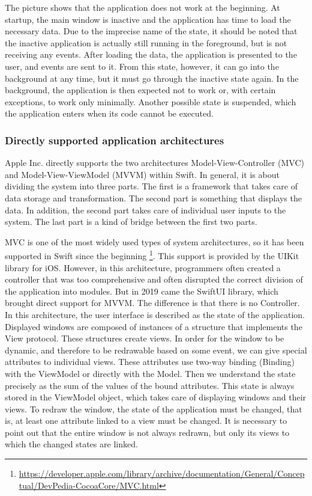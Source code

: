 \documentclass[
  biblatex = false,
  language=english,
  figures=false,
  sourcecodes,
  glossaries,
  index
]{kidiplom}
\begin{document}
The picture shows that the application does not work at the beginning. At startup, the main window is inactive and the application has time to load the necessary data. Due to the imprecise name of the state, it should be noted that the inactive application is actually still running in the foreground, but is not receiving any events. After loading the data, the application is presented to the user, and events are sent to it. From this state, however, it can go into the background at any time, but it must go through the inactive state again. In the background, the application is then expected not to work or, with certain exceptions, to work only minimally. Another possible state is suspended, which the application enters when its code cannot be executed.

\subsubsection{Directly supported application architectures}
Apple Inc. directly supports the two architectures Model-View-Controller (MVC) and Model-View-ViewModel (MVVM) within Swift. In general, it is about dividing the system into three parts. The first is a framework that takes care of data storage and transformation. The second part is something that displays the data. In addition, the second part takes care of individual user inputs to the system. The last part is a kind of bridge between the first two parts.

MVC is one of the most widely used types of system architectures, so it has been supported in Swift since the beginning \footnote{\url{https://developer.apple.com/library/archive/documentation/General/Conceptual/DevPedia-CocoaCore/MVC.html}}. This support is provided by the UIKit library for iOS. However, in this architecture, programmers often created a controller that was too comprehensive and often disrupted the correct division of the application into modules. But in 2019 came the SwiftUI library, which brought direct support for MVVM. 
The difference is that there is no Controller. In this architecture, the user interface is described as the state of the application. Displayed windows are composed of instances of a structure that implements the View protocol. These structures create views. In order for the window to be dynamic, and therefore to be redrawable based on some event, we can give special attributes to individual views. These attributes use two-way binding (Binding) with the ViewModel or directly with the Model. Then we understand the state precisely as the sum of the values of the bound attributes. This state is always stored in the ViewModel object, which takes care of displaying windows and their views. To redraw the window, the state of the application must be changed, that is, at least one attribute linked to a view must be changed. It is necessary to point out that the entire window is not always redrawn, but only its views to which the changed states are linked.
\end{document}

